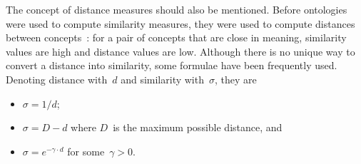 
The concept of distance measures should also be mentioned. Before ontologies were used to compute similarity measures, they were used to compute distances between concepts~\citep{Rada1989}: for a pair of concepts that are close in meaning, similarity values are high and distance values are low. Although there is no unique way to convert a distance into similarity, some formulae have been frequently used. Denoting distance with~$d$ and similarity with~$\sigma$, they are
\begin{itemize}[itemsep=0pt]
    \item $\sigma = 1/d$;
    \item $\sigma = D - d$ where $D$~is the maximum possible distance, and
    \item $\sigma = e^{-\gamma \cdot d}$ for some~$\gamma > 0$.
\end{itemize}







